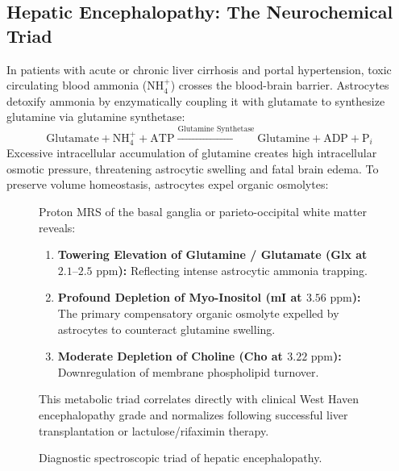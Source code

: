 \documentclass[11pt,a4paper]{article}
\begin{document}
\subsection{Hepatic Encephalopathy: The Neurochemical Triad}
In patients with acute or chronic liver cirrhosis and portal hypertension, toxic circulating blood ammonia ($\text{NH}_4^+$) crosses the blood-brain barrier. Astrocytes detoxify ammonia by enzymatically coupling it with glutamate to synthesize glutamine via glutamine synthetase:
\begin{equation}
    \text{Glutamate} + \text{NH}_4^+ + \text{ATP} \xrightarrow{\text{Glutamine Synthetase}} \text{Glutamine} + \text{ADP} + \text{P}_i
\end{equation}
Excessive intracellular accumulation of glutamine creates high intracellular osmotic pressure, threatening astrocytic swelling and fatal brain edema. To preserve volume homeostasis, astrocytes expel organic osmolytes:
\begin{figure}[htbp]
\centering
\begin{tcolorbox}[colback=purple!5!white,colframe=purple!60!black,title=\textbf{The Pathognomonic Spectroscopic Triad of Hepatic Encephalopathy},width=\linewidth]
\small
Proton MRS of the basal ganglia or parieto-occipital white matter reveals:
\begin{enumerate}
    \item \textbf{Towering Elevation of Glutamine / Glutamate (Glx at $2.1\text{--}2.5\text{ ppm}$):} Reflecting intense astrocytic ammonia trapping.
    \item \textbf{Profound Depletion of Myo-Inositol (mI at $3.56\text{ ppm}$):} The primary compensatory organic osmolyte expelled by astrocytes to counteract glutamine swelling.
    \item \textbf{Moderate Depletion of Choline (Cho at $3.22\text{ ppm}$):} Downregulation of membrane phospholipid turnover.
\end{enumerate}
This metabolic triad correlates directly with clinical West Haven encephalopathy grade and normalizes following successful liver transplantation or lactulose/rifaximin therapy.
\end{tcolorbox}
\caption{Diagnostic spectroscopic triad of hepatic encephalopathy.}
\label{fig:hepatic_encephalopathy}
\end{figure}
\end{document}

